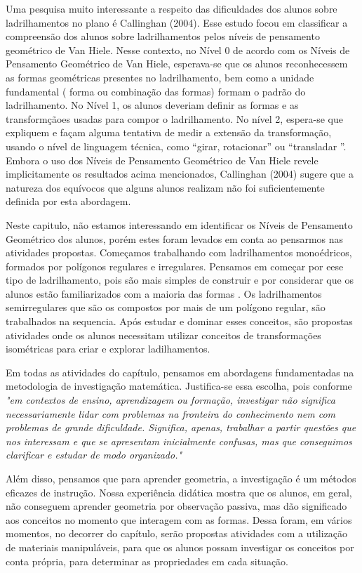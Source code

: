 \begin{apresentacao}
Uma pesquisa muito interessante a respeito das dificuldades dos alunos sobre ladrilhamentos no plano é Callinghan (2004). Esse estudo focou em classificar a compreensão dos alunos sobre ladrilhamentos pelos níveis de pensamento geométrico de Van Hiele. Nesse contexto, no Nível 0 de acordo com os Níveis de Pensamento Geométrico de Van Hiele, esperava-se que os alunos reconhecessem as formas geométricas presentes no ladrilhamento, bem como a unidade fundamental ( forma ou combinação das formas) formam o padrão do ladrilhamento. No Nível 1, os alunos deveriam definir as formas e as transformçãoes  usadas para compor o ladrilhamento. No nível 2, espera-se que expliquem e façam alguma tentativa de medir a extensão da transformação, usando o nível de linguagem técnica, como “girar, rotacionar” ou “transladar ”. Embora o uso dos Níveis de Pensamento Geométrico de Van Hiele revele implicitamente os resultados acima mencionados, Callinghan (2004) sugere que a natureza dos equívocos que alguns alunos realizam não foi suficientemente definida por esta abordagem. 

Neste capitulo, não estamos interessando em identificar os Níveis de Pensamento Geométrico dos alunos, porém estes foram levados em conta ao pensarmos nas atividades propostas. Começamos trabalhando com ladrilhamentos monoédricos, formados por polígonos regulares e irregulares. Pensamos em começar por eese tipo de ladrilhamento, pois são mais simples de construir e por considerar que  os alunos estão familiarizados com a maioria das  formas . Os ladrilhamentos semirregulares que são os compostos por mais de um polígono regular, são trabalhados na sequencia. Após estudar e dominar esses conceitos, são propostas atividades onde os alunos necessitam utilizar conceitos de transformações isométricas para criar e explorar ladilhamentos.

Em todas as atividades do capítulo, pensamos em abordagens fundamentadas na metodologia de investigação matemática. Justifica-se essa escolha, pois conforme \cite[p.2]{Ponte} \textit{"em contextos de ensino, aprendizagem ou formação, investigar não significa necessariamente lidar com problemas na fronteira do conhecimento nem com problemas de grande dificuldade. Significa, apenas, trabalhar a partir questões que nos interessam e que se apresentam inicialmente confusas, mas que conseguimos clarificar e estudar de modo organizado." }

Além disso, pensamos que para aprender geometria, a investigação é um métodos eficazes de instrução. Nossa experiência didática mostra que os alunos, em geral, não conseguem aprender geometria por observação passiva, mas dão significado aos conceitos no momento que interagem com as formas. Dessa foram, em vários momentos, no decorrer do capítulo, serão propostas atividades com a utilização de materiais manipuláveis, para que os alunos possam investigar os conceitos por conta própria,  para determinar as propriedades em cada situação. 



\end{apresentacao}
